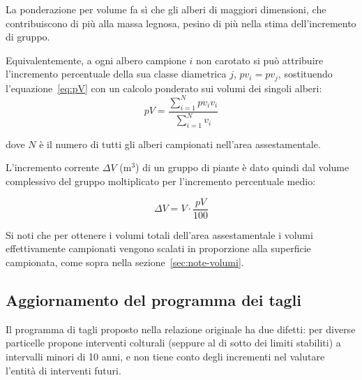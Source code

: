 \documentclass[a4paper,11pt]{article}
\begin{document}
La ponderazione per volume fa sì che gli alberi di maggiori dimensioni, che contribuiscono di più alla massa legnosa, pesino di più nella stima dell'incremento di gruppo.

Equivalentemente, a ogni albero campione $i$ non carotato si può attribuire l'incremento percentuale della sua classe diametrica $j$, $pv_i = pv_j$, sostituendo l'equazione~\ref{eq:pV} con un calcolo ponderato sui volumi dei singoli alberi:
\begin{equation}
    \label{eq:pV2}
    pV = \frac{\sum_{i=1}^{N}pv_iv_i}{\sum_{i=1}^{N}v_i}
\end{equation}

dove $N$ è il numero di tutti gli alberi campionati nell'area assestamentale.

L'incremento corrente $\Delta V$ (m$^3$) di un gruppo di piante è dato quindi dal volume complessivo del gruppo moltiplicato per l'incremento percentuale medio:

\[ \Delta V = V \cdot \frac{pV}{100} \]

Si noti che per ottenere i volumi totali dell'area assestamentale i volumi effettivamente campionati vengono scalati in proporzione alla superficie campionata, come sopra nella sezione~\ref{sec:note-volumi}.

%
%
%
%
%


\subsection{Aggiornamento del programma dei tagli}
\label{sec:note:piano}

Il programma di tagli proposto nella relazione originale ha due difetti: per diverse particelle propone interventi colturali (seppure al di sotto dei limiti stabiliti) a intervalli minori di 10 anni, e non tiene conto degli incrementi nel valutare l'entità di interventi futuri.
\end{document}

